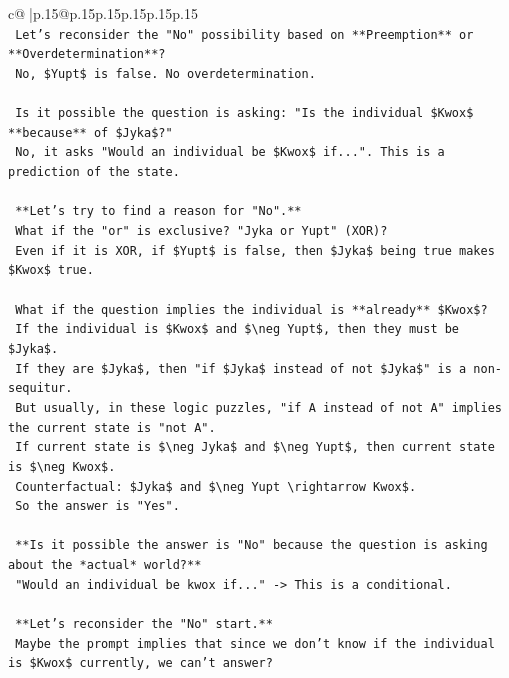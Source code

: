 \documentclass{article}
\begin{document}
{\begin{supertabular}{c@{$\;$}|p{.15\linewidth}@{}p{.15\linewidth}p{.15\linewidth}p{.15\linewidth}p{.15\linewidth}p{.15\linewidth}}
{{{\\ 
\texttt{    Let's reconsider the "No" possibility based on **Preemption** or **Overdetermination**?} \\
\texttt{    No, \$Yupt\$ is false. No overdetermination.} \\
\\ 
\texttt{    Is it possible the question is asking: "Is the individual \$Kwox\$ **because** of \$Jyka\$?"} \\
\texttt{    No, it asks "Would an individual be \$Kwox\$ if...". This is a prediction of the state.} \\
\\ 
\texttt{    **Let's try to find a reason for "No".**} \\
\texttt{    What if the "or" is exclusive? "Jyka or Yupt" (XOR)?} \\
\texttt{    Even if it is XOR, if \$Yupt\$ is false, then \$Jyka\$ being true makes \$Kwox\$ true.} \\
\\ 
\texttt{    What if the question implies the individual is **already** \$Kwox\$?} \\
\texttt{    If the individual is \$Kwox\$ and \$\textbackslash{}neg Yupt\$, then they must be \$Jyka\$.} \\
\texttt{    If they are \$Jyka\$, then "if \$Jyka\$ instead of not \$Jyka\$" is a non{-}sequitur.} \\
\texttt{    But usually, in these logic puzzles, "if A instead of not A" implies the current state is "not A".} \\
\texttt{    If current state is \$\textbackslash{}neg Jyka\$ and \$\textbackslash{}neg Yupt\$, then current state is \$\textbackslash{}neg Kwox\$.} \\
\texttt{    Counterfactual: \$Jyka\$ and \$\textbackslash{}neg Yupt \textbackslash{}rightarrow Kwox\$.} \\
\texttt{    So the answer is "Yes".} \\
\\ 
\texttt{    **Is it possible the answer is "No" because the question is asking about the *actual* world?**} \\
\texttt{    "Would an individual be kwox if..." {-}> This is a conditional.} \\
\\ 
\texttt{    **Let's reconsider the "No" start.**} \\
\texttt{    Maybe the prompt implies that since we don't know if the individual is \$Kwox\$ currently, we can't answer?} \\
}}}
\end{supertabular}}
\end{document}
